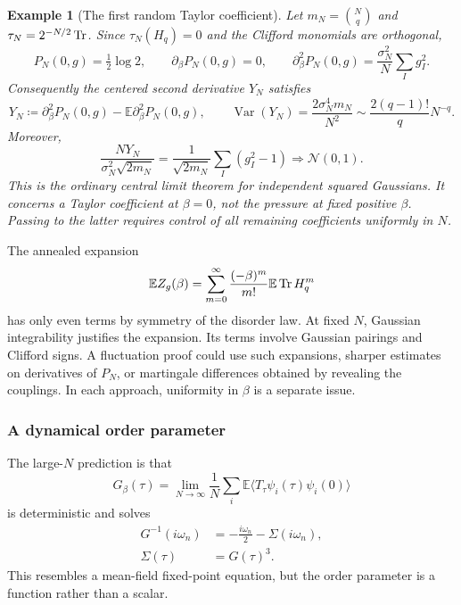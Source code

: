 \documentclass[11pt]{article}
\numberwithin{equation}{section}
\theoremstyle{exposition}
\newtheorem{example}[definition]{Example}
\theoremstyle{result}
\newcommand{\E}{\mathbb E}
\begin{document}
\begin{example}[The first random Taylor coefficient]
Let $m_N=\binom Nq$ and $\tau_N=2^{-N/2}\Tr$. Since $\tau_N(H_q)=0$ and the Clifford monomials are orthogonal,
\begin{equation*}
P_N(0,g)=\tfrac12\log2,\qquad
\partial_\beta P_N(0,g)=0,\qquad
\partial_\beta^2P_N(0,g)=\frac{\sigma_N^2}{N}\sum_I g_I^2.
\end{equation*}
Consequently the centered second derivative $Y_N$ satisfies
\begin{equation*}
Y_N\coloneqq \partial_\beta^2P_N(0,g)-\E\partial_\beta^2P_N(0,g),
\qquad
\operatorname{Var}(Y_N)=\frac{2\sigma_N^4m_N}{N^2}
\sim\frac{2(q-1)!}{q}N^{-q}.
\end{equation*}
Moreover,
\begin{equation*}
\frac{N Y_N}{\sigma_N^2\sqrt{2m_N}}
=\frac1{\sqrt{2m_N}}\sum_I(g_I^2-1)
\Longrightarrow\mathcal N(0,1).
\end{equation*}
This is the ordinary central limit theorem for independent squared Gaussians. It concerns a Taylor coefficient at $\beta=0$, not the pressure at fixed positive $\beta$. Passing to the latter requires control of all remaining coefficients uniformly in $N$.
\end{example}

The annealed expansion
\begin{equation*}
\E Z_g(\beta)=\sum_{m=0}^\infty\frac{(-\beta)^m}{m!}\E\Tr H_q^m
\end{equation*}
has only even terms by symmetry of the disorder law. At fixed $N$, Gaussian integrability justifies the expansion. Its terms involve Gaussian pairings and Clifford signs. A fluctuation proof could use such expansions, sharper estimates on derivatives of $P_N$, or martingale differences obtained by revealing the couplings. In each approach, uniformity in $\beta$ is a separate issue.

\subsubsection{A dynamical order parameter}

The large-$N$ prediction is that
\begin{equation*}
G_\beta(\tau)
=\lim_{N\to\infty}
\frac1N\sum_i\E\langle T_\tau\psi_i(\tau)\psi_i(0)\rangle
\end{equation*}
is deterministic and solves
\begin{align*}
G^{-1}(i\omega_n)&=-\frac{i\omega_n}{2}-\Sigma(i\omega_n),\\
\Sigma(\tau)&=G(\tau)^3.
\end{align*}
This resembles a mean-field fixed-point equation, but the order parameter is a function rather than a scalar.
\end{document}
